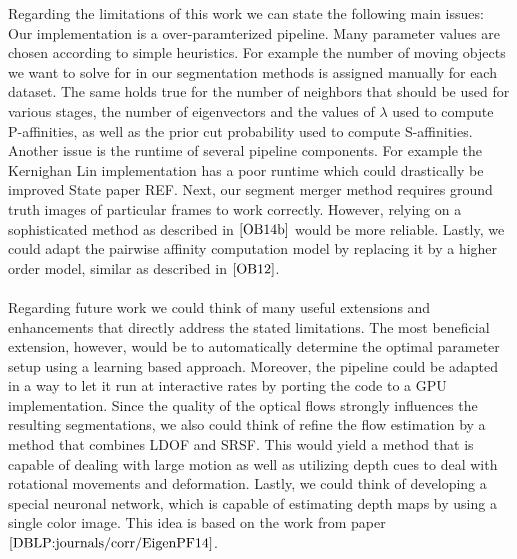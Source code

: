 Regarding the limitations of this work we can state the following main issues: Our implementation is a over-paramterized pipeline. Many parameter values are chosen according to simple heuristics. For example the number of moving objects we want to solve for in our segmentation methods is assigned manually for each dataset. The same holds true for the number of neighbors that should be used for various stages, the number of eigenvectors and the values of $\lambda$ used to compute P-affinities, as well as the prior cut probability used to compute S-affinities. Another issue is the runtime of several pipeline components. For example the Kernighan Lin implementation has a poor runtime which could drastically be improved State paper REF. Next, our segment merger method requires ground truth images of particular frames to work correctly. However, relying on a sophisticated method as described in $\cite{OB14b}$ would be more reliable. Lastly, we could adapt the pairwise affinity computation model by replacing it by a higher order model, similar as described in $\cite{OB12}$. \\ \\
Regarding future work we could think of many useful extensions and enhancements that directly address the stated limitations. The most beneficial extension, however, would be to automatically determine the optimal parameter setup using a learning based approach. Moreover, the pipeline could be adapted in a way to let it run at interactive rates by porting the code to a GPU implementation. Since the quality of the optical flows strongly influences the resulting segmentations, we also could think of refine the flow estimation by a method that combines LDOF and SRSF. This would yield a method that is capable of dealing with large motion as well as utilizing depth cues to deal with rotational movements and deformation. Lastly, we could think of developing a special neuronal network, which is capable of estimating depth maps by using a single color image. This idea is based on the work from paper $\cite{DBLP:journals/corr/EigenPF14}$.  

